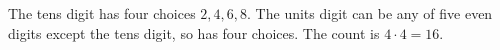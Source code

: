 The tens digit has four choices $2,4,6,8$. The units digit can be any of five even digits except the tens digit, so has four choices. The count is $4\cdot4=\boxed{16}$.
